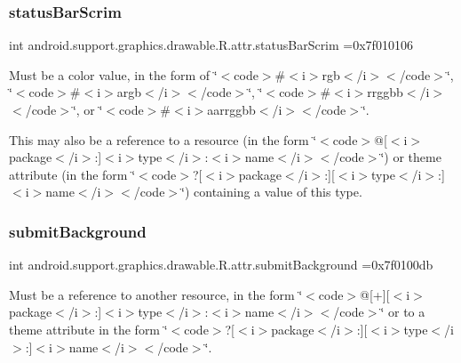 \subsubsection{\texorpdfstring{status\+Bar\+Scrim}{statusBarScrim}}
{\footnotesize\ttfamily int android.\+support.\+graphics.\+drawable.\+R.\+attr.\+status\+Bar\+Scrim =0x7f010106\hspace{0.3cm}{\ttfamily [static]}}

Must be a color value, in the form of \char`\"{}$<$code$>$\#$<$i$>$rgb$<$/i$>$$<$/code$>$\char`\"{}, \char`\"{}$<$code$>$\#$<$i$>$argb$<$/i$>$$<$/code$>$\char`\"{}, \char`\"{}$<$code$>$\#$<$i$>$rrggbb$<$/i$>$$<$/code$>$\char`\"{}, or \char`\"{}$<$code$>$\#$<$i$>$aarrggbb$<$/i$>$$<$/code$>$\char`\"{}. 

This may also be a reference to a resource (in the form \char`\"{}$<$code$>$@\mbox{[}$<$i$>$package$<$/i$>$\+:\mbox{]}$<$i$>$type$<$/i$>$\+:$<$i$>$name$<$/i$>$$<$/code$>$\char`\"{}) or theme attribute (in the form \char`\"{}$<$code$>$?\mbox{[}$<$i$>$package$<$/i$>$\+:\mbox{]}\mbox{[}$<$i$>$type$<$/i$>$\+:\mbox{]}$<$i$>$name$<$/i$>$$<$/code$>$\char`\"{}) containing a value of this type. \mbox{\label{classandroid_1_1support_1_1graphics_1_1drawable_1_1R_1_1attr_a516ee932c13db0421f20e1f2818077c0}} 
\subsubsection{\texorpdfstring{submit\+Background}{submitBackground}}
{\footnotesize\ttfamily int android.\+support.\+graphics.\+drawable.\+R.\+attr.\+submit\+Background =0x7f0100db\hspace{0.3cm}{\ttfamily [static]}}

Must be a reference to another resource, in the form \char`\"{}$<$code$>$@\mbox{[}+\mbox{]}\mbox{[}$<$i$>$package$<$/i$>$\+:\mbox{]}$<$i$>$type$<$/i$>$\+:$<$i$>$name$<$/i$>$$<$/code$>$\char`\"{} or to a theme attribute in the form \char`\"{}$<$code$>$?\mbox{[}$<$i$>$package$<$/i$>$\+:\mbox{]}\mbox{[}$<$i$>$type$<$/i$>$\+:\mbox{]}$<$i$>$name$<$/i$>$$<$/code$>$\char`\"{}. \mbox{\label{classandroid_1_1support_1_1graphics_1_1drawable_1_1R_1_1attr_a24db67f2502f723666f0577dbff40bfb}} 
